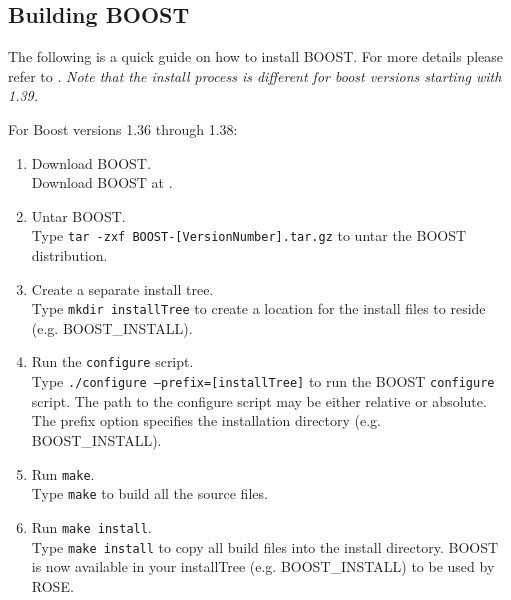 \subsection{Building BOOST}
\label{gettingStarted:BOOST}

The following is a quick guide on how to install BOOST. For more details please 
refer to .
{\em Note that the install process is different for boost versions starting with 1.39.}

For Boost versions 1.36 through 1.38:
\begin{enumerate}
     \item Download BOOST. \\
       Download BOOST at .
     \item Untar BOOST. \\
       Type {\tt tar -zxf BOOST-[VersionNumber].tar.gz} to untar the BOOST distribution.
     \item Create a separate install tree. \\
           Type {\tt mkdir installTree} to create a location for the install files to reside (e.g. BOOST\_INSTALL).
     \item Run the {\tt configure} script. \\
           Type {\tt ./configure --prefix=[installTree]} 
           to run the BOOST {\tt configure} script.  The path to the configure script 
           may be either relative or absolute. The prefix option specifies the installation directory (e.g. BOOST\_INSTALL).
     \item Run {\tt make}. \\
           Type {\tt make} to build all the source files. 
     \item Run {\tt make install}. \\
           Type {\tt make install} to copy all build files into the install directory. BOOST is now available in your 
           installTree (e.g. BOOST\_INSTALL) to be used by ROSE.
\end{enumerate}



